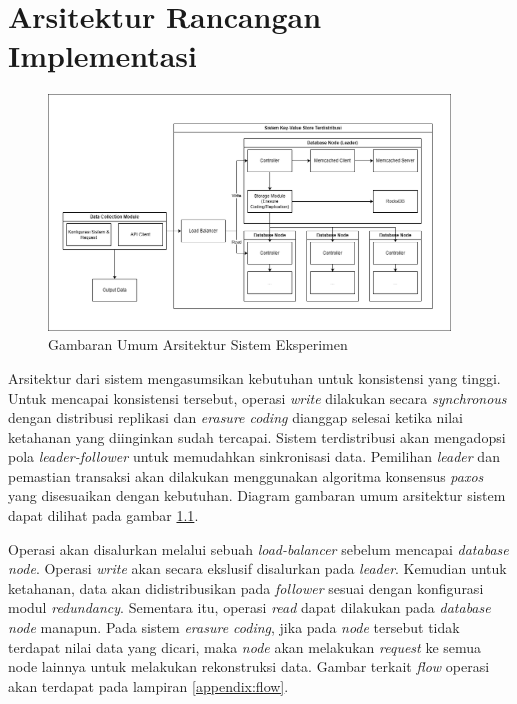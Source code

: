 \chapter{Arsitektur Rancangan Implementasi}
\label{appendix:architecture}

\begin{figure}[ht]
    \centering
    \includegraphics[width=0.95\textwidth]{resources/appendix/general-architecture.png}
    \caption{Gambaran Umum Arsitektur Sistem Eksperimen}
    \label{fig:general-architecture}
\end{figure}

Arsitektur dari sistem mengasumsikan kebutuhan untuk konsistensi yang tinggi. Untuk mencapai konsistensi tersebut, operasi \textit{write} dilakukan secara \textit{synchronous} dengan distribusi replikasi dan \textit{erasure coding} dianggap selesai ketika nilai ketahanan yang diinginkan sudah tercapai. Sistem terdistribusi akan mengadopsi pola \textit{leader-follower} untuk memudahkan sinkronisasi data. Pemilihan \textit{leader} dan pemastian transaksi akan dilakukan menggunakan algoritma konsensus \textit{paxos} yang disesuaikan dengan kebutuhan. Diagram gambaran umum arsitektur sistem dapat dilihat pada gambar \ref{fig:general-architecture}.

Operasi akan disalurkan melalui sebuah \textit{load-balancer} sebelum mencapai \textit{database node}. Operasi \textit{write} akan secara ekslusif disalurkan pada \textit{leader}. Kemudian untuk ketahanan, data akan didistribusikan pada \textit{follower} sesuai dengan konfigurasi modul \textit{redundancy}. Sementara itu, operasi \textit{read} dapat dilakukan pada \textit{database node} manapun. Pada sistem \textit{erasure coding}, jika pada \textit{node} tersebut tidak terdapat nilai data yang dicari, maka \textit{node} akan melakukan \textit{request} ke semua node lainnya untuk melakukan rekonstruksi data. Gambar terkait \textit{flow} operasi akan terdapat pada lampiran \ref{appendix:flow}.
